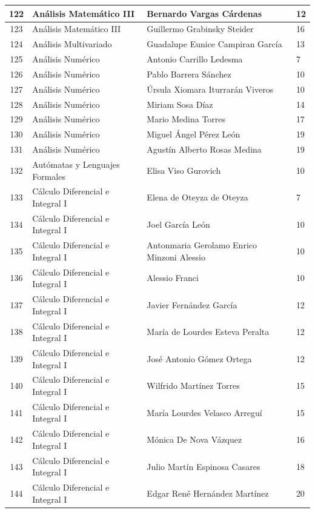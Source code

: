 {\begin{longtable}{|c|p{6.5cm}|p{5cm}|p{1.5cm}|}
  122 & Análisis Matemático III & Bernardo Vargas Cárdenas & 12 \\ \hline
  123 & Análisis Matemático III & Guillermo Grabinsky Steider & 16 \\ \hline
  124 & Análisis Multivariado & Guadalupe Eunice Campiran García & 13 \\ \hline
  125 & Análisis Numérico & Antonio Carrillo Ledesma & 7 \\ \hline
  126 & Análisis Numérico & Pablo Barrera Sánchez & 10 \\ \hline
  127 & Análisis Numérico & Úrsula Xiomara Iturrarán Viveros & 10 \\ \hline
  128 & Análisis Numérico & Miriam Sosa Díaz & 14 \\ \hline
  129 & Análisis Numérico & Mario Medina Torres & 17 \\ \hline
  130 & Análisis Numérico & Miguel Ángel Pérez León & 19 \\ \hline
  131 & Análisis Numérico & Agustín Alberto Rosas Medina & 19 \\ \hline
  132 & Autómatas y Lenguajes Formales & Elisa Viso Gurovich & 10 \\ \hline
  133 & Cálculo Diferencial e Integral I & Elena de Oteyza de Oteyza & 7 \\ \hline
  134 & Cálculo Diferencial e Integral I & Joel García León & 10 \\ \hline
  135 & Cálculo Diferencial e Integral I & Antonmaria Gerolamo Enrico Minzoni Alessio & 10 \\ \hline
  136 & Cálculo Diferencial e Integral I & Alessio Franci & 10 \\ \hline
  137 & Cálculo Diferencial e Integral I & Javier Fernández García & 12 \\ \hline
  138 & Cálculo Diferencial e Integral I & María de Lourdes Esteva Peralta & 12 \\ \hline
  139 & Cálculo Diferencial e Integral I & José Antonio Gómez Ortega & 12 \\ \hline
  140 & Cálculo Diferencial e Integral I & Wilfrido Martínez Torres & 15 \\ \hline
  141 & Cálculo Diferencial e Integral I & María Lourdes Velasco Arreguí & 15 \\ \hline
  142 & Cálculo Diferencial e Integral I & Mónica De Nova Vázquez & 16 \\ \hline
  143 & Cálculo Diferencial e Integral I & Julio Martín Espinosa Casares & 18 \\ \hline
  144 & Cálculo Diferencial e Integral I & Edgar René Hernández Martínez & 20 \\ \hline

\end{longtable}}
